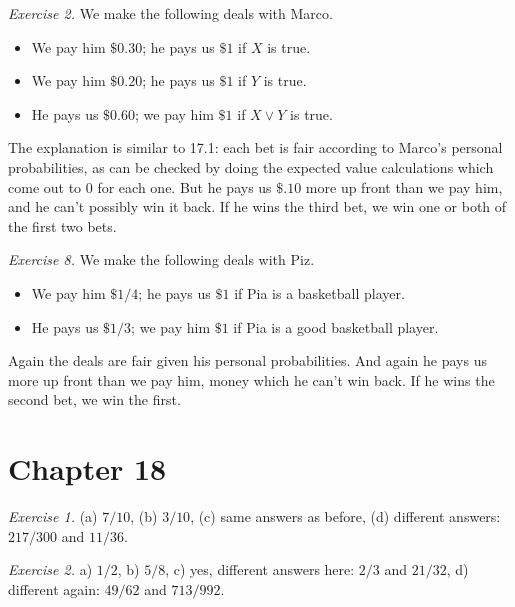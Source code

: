 \documentclass[justified]{tufte-book}
\providecommand{\tightlist}{%
  \setlength{\itemsep}{0pt}\setlength{\parskip}{0pt}}
\begin{document}
\vspace{.5em}

\noindent
\emph{Exercise 2.} We make the following deals with Marco.

\begin{itemize}
\tightlist
\item
  We pay him \(\$0.30\); he pays us \(\$1\) if \(X\) is true.
\item
  We pay him \(\$0.20\); he pays us \(\$1\) if \(Y\) is true.
\item
  He pays us \(\$0.60\); we pay him \(\$1\) if \(X \vee Y\) is true.
\end{itemize}

The explanation is similar to 17.1: each bet is fair according to Marco's personal probabilities, as can be checked by doing the expected value calculations which come out to \(0\) for each one. But he pays us \(\$.10\) more up front than we pay him, and he can't possibly win it back. If he wins the third bet, we win one or both of the first two bets.

\vspace{.5em}

\noindent
\emph{Exercise 8.} We make the following deals with Piz.

\begin{itemize}
\tightlist
\item
  We pay him \(\$1/4\); he pays us \(\$1\) if Pia is a basketball player.
\item
  He pays us \(\$1/3\); we pay him \(\$1\) if Pia is a good basketball player.
\end{itemize}

Again the deals are fair given his personal probabilities. And again he pays us more up front than we pay him, money which he can't win back. If he wins the second bet, we win the first.

\hypertarget{chapter-18}{%
\section*{Chapter 18}\label{chapter-18}}

\noindent
\emph{Exercise 1.} (a) \(7/10\), (b) \(3/10\), (c) same answers as before, (d) different answers: \(217/300\) and \(11/36\).

\vspace{.5em}

\noindent
\emph{Exercise 2.} a) \(1/2\), b) \(5/8\), c) yes, different answers here: \(2/3\) and \(21/32\), d) different again: \(49/62\) and \(713/992\).
\end{document}
